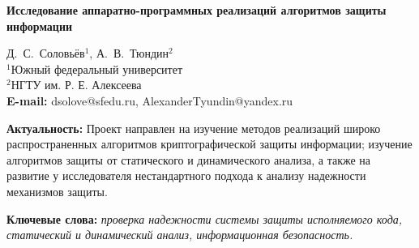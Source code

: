 \documentclass[a4paper,12pt]{article}
\def\titleK#1{\begin{center}{\Large\textbf{#1}}\end{center}}
\def\authorK#1{\begin{center}{#1}\end{center}}
\theoremstyle{definition}
\begin{document}
\titleK{Исследование аппаратно-программных реализаций алгоритмов защиты информации}

\authorK{Д.~С.~Соловьёв$^{1}$, А.~В.~Тюндин$^{2}$\\
$^{1}$Южный федеральный университет \\ $^{2}$НГТУ им. Р. Е. Алексеева \\ 
{\bf E-mail:} dsolove@sfedu.ru, AlexanderTyundin@yandex.ru}

\begin{abstract}

\end{abstract}


{\bf Актуальность:} Проект направлен на изучение методов реализаций широко распространенных алгоритмов криптографической защиты информации; изучение алгоритмов защиты от статического и динамического анализа, а также на развитие у исследователя нестандартного подхода к анализу надежности механизмов защиты.

{\bf Ключевые слова:} \textit{проверка надежности системы защиты исполняемого кода, статический и динамический анализ, информационная безопасность.} 
\end{document}
